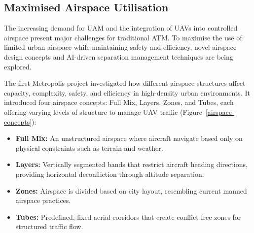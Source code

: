 \subsection{Maximised Airspace Utilisation}


The increasing demand for \gls{UAM} and the integration of \glspl{UAV} into controlled airspace present major challenges for traditional \gls{ATM}. 
To maximise the use of limited urban airspace while maintaining safety and efficiency, novel airspace design concepts and AI-driven separation management techniques are being explored.


The first Metropolis project investigated how different airspace structures affect capacity, complexity, safety, and efficiency in high-density urban environments. 
It introduced four airspace concepts: Full Mix, Layers, Zones, and Tubes, each offering varying levels of structure to manage \gls{UAV} traffic (Figure~\ref{airspace-concepts}):

\begin{itemize}
    \item \textbf{Full Mix:} An unstructured airspace where aircraft navigate based only on physical constraints such as terrain and weather.
    \item \textbf{Layers:} Vertically segmented bands that restrict aircraft heading directions, providing horizontal deconfliction through altitude separation.
    \item \textbf{Zones:} Airspace is divided based on city layout, resembling current manned airspace practices.
    \item \textbf{Tubes:} Predefined, fixed aerial corridors that create conflict-free zones for structured traffic flow.
\end{itemize}

